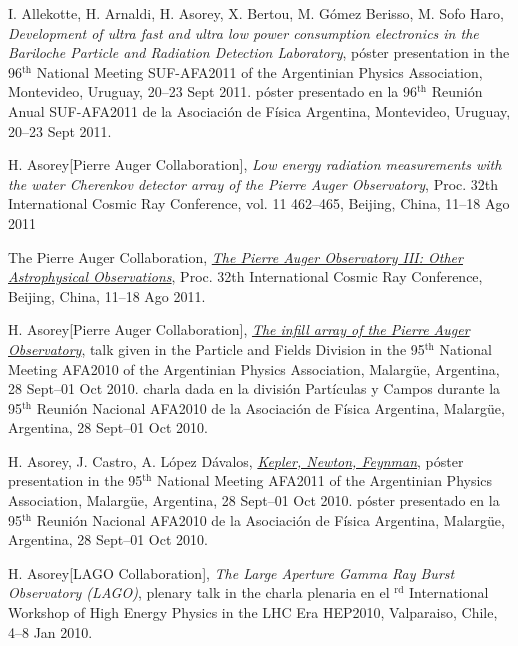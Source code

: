 \begin{etaremune}
\item {}I. Allekotte, H. Arnaldi, H. Asorey, X. Bertou, M. Gómez Berisso,
M. Sofo Haro, {\emph{Development of ultra fast and ultra low power consumption
electronics in the Bariloche Particle and Radiation Detection Laboratory}},
\ifeng
póster presentation in the 96$^{\mathrm{th}}$ National Meeting SUF-AFA2011 of the Argentinian Physics Association, Montevideo, Uruguay, 20--23 Sept 2011.
\else
póster presentado en la 96$^{\mathrm{th}}$ Reunión Anual SUF-AFA2011 de la Asociación de Física Argentina, Montevideo, Uruguay, 20--23 Sept 2011.
\fi

\item {}H. Asorey[Pierre Auger Collaboration], {\emph{Low energy radiation
measurements with the water Cherenkov detector array of the Pierre Auger
Observatory}}, \en Proc. 32th International Cosmic Ray Conference, vol. 11
462--465, Beijing, China, 11--18 Ago 2011

\item {}The Pierre Auger Collaboration,
\href{http://arxiv.org/abs/1107.4805}{\emph{The Pierre Auger Observatory III:
Other Astrophysical Observations}}, \en Proc. 32th International Cosmic Ray
Conference, Beijing, China, 11--18 Ago 2011.

\item {}H. Asorey[Pierre Auger Collaboration],
\href{http://95rnf.afa.webfactional.com/tex\_files/Resumenes/DPyC/PyC\_6.pdf}{\emph{The
infill array of the Pierre Auger Observatory}}, 
\ifeng
talk given in the Particle and Fields Division in the 95$^{\mathrm{th}}$ National Meeting AFA2010 of the Argentinian Physics Association, Malargüe, Argentina, 28 Sept--01 Oct 2010.
\else
charla dada en la división Partículas y Campos durante la 95$^{\mathrm{th}}$ Reunión Nacional AFA2010 de la Asociación de Física Argentina, Malargüe, Argentina, 28 Sept--01 Oct 2010.
\fi

\item {}H. Asorey, J. Castro, A. López Dávalos,
\href{http://95rnf.afa.webfactional.com/tex\_files/Resumenes/EF/asorey.pdf}{\emph{Kepler,
Newton, Feynman}}, 
\ifeng
póster presentation in the 95$^{\mathrm{th}}$ National Meeting AFA2011 of the Argentinian Physics Association, Malargüe, Argentina, 28 Sept--01 Oct 2010.
\else
póster presentado en la 95$^{\mathrm{th}}$ Reunión Nacional AFA2010 de la Asociación de Física Argentina, Malargüe, Argentina, 28 Sept--01 Oct 2010.
\fi

\item {}H. Asorey[LAGO Collaboration], {\emph{The Large Aperture Gamma Ray Burst Observatory (LAGO)}}, 
\ifeng
plenary talk in the 
\else
charla plenaria en el 
$^{\mathrm{rd}}$ International Workshop of High Energy Physics in the LHC Era HEP2010, Valparaiso, Chile, 4--8 Jan 2010.


\end{etaremune}
